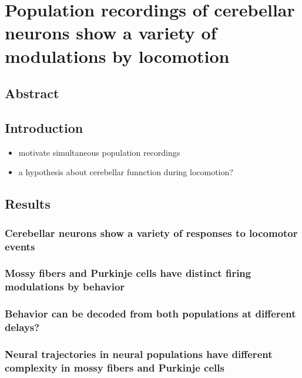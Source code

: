 
%

\chapter{Population recordings of cerebellar neurons show a variety of modulations by locomotion}
\label{cha:locopixels}

\section{Abstract}
\section{Introduction}
\begin{itemize}
    \item motivate simultaneous population recordings
    \item a hypothesis about cerebellar funnction during locomotion?
\end{itemize}

\section{Results}
\subsection{Cerebellar neurons show a variety of responses to locomotor events}
\subsection{Mossy fibers and Purkinje cells have distinct firing modulations by behavior}
\subsection{Behavior can be decoded from both populations at different delays?}
\subsection{Neural trajectories in neural populations have different complexity in mossy fibers and Purkinje cells}
